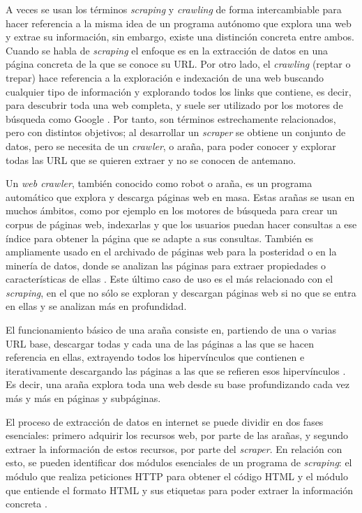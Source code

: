 A veces se usan los términos \textit{scraping} y \textit{crawling} de forma
intercambiable para hacer referencia a la misma idea de un programa autónomo que
explora una web y extrae su información, sin embargo, existe una distinción
concreta entre ambos. Cuando se habla de \textit{scraping} el enfoque es en la
extracción de datos en una página concreta de la que se conoce su URL. Por otro
lado, el \textit{crawling} (reptar o trepar) hace referencia a la exploración e
indexación de una web buscando cualquier tipo de información y explorando todos
los links que contiene, es decir, para descubrir toda una web completa, y suele
ser utilizado por los motores de búsqueda como Google \cite{scrapingvscrawling}.
Por tanto, son términos estrechamente relacionados, pero con distintos
objetivos; al desarrollar un \textit{scraper} se obtiene un conjunto de datos,
pero se necesita de un \textit{crawler}, o araña, para poder conocer y explorar
todas las URL que se quieren extraer y no se conocen de antemano.

Un \textit{web crawler}, también conocido como robot o araña, es un programa
automático que explora y descarga páginas web en masa. Estas arañas se usan en
muchos ámbitos, como por ejemplo en los motores de búsqueda para crear un corpus
de páginas web, indexarlas y que los usuarios puedan hacer consultas a ese
índice para obtener la página que se adapte a sus consultas. También es
ampliamente usado en el archivado de páginas web para la posteridad o en la
minería de datos, donde se analizan las páginas para extraer propiedades o
características de ellas \cite{olston2010web}. Este último caso de uso es el más
relacionado con el \textit{scraping}, en el que no sólo se exploran y descargan
páginas web si no que se entra en ellas y se analizan más en profundidad.

El funcionamiento básico de una araña consiste en, partiendo de una o varias URL
base, descargar todas y cada una de las páginas a las que se hacen referencia en
ellas, extrayendo todos los hipervínculos que contienen e iterativamente
descargando las páginas a las que se refieren esos hipervínculos
\cite{olston2010web}. Es decir, una araña explora toda una web desde su base
profundizando cada vez más y más en páginas y subpáginas.  

El proceso de extracción de datos en internet se puede dividir en dos fases esenciales: primero adquirir los recursos web, por parte de las arañas, y segundo extraer la información de estos recursos, por parte del \textit{scraper}. En relación con esto, se pueden identificar dos módulos esenciales de un programa de \textit{scraping}: el módulo que realiza peticiones HTTP para obtener el código HTML y el módulo que entiende el formato HTML y sus etiquetas para poder extraer la información concreta \cite{zhao2017web}.

